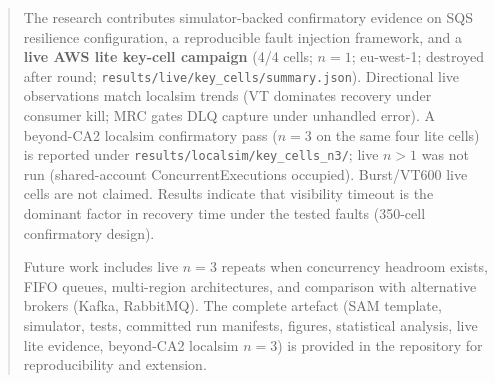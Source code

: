 \begin{abstract}
The research contributes simulator-backed confirmatory evidence on SQS resilience configuration, a reproducible fault injection framework, and a \textbf{live AWS lite key-cell campaign} (4/4 cells; $n{=}1$; eu-west-1; destroyed after round; \texttt{results/live/key\_cells/summary.json}). Directional live observations match localsim trends (VT dominates recovery under consumer kill; MRC gates DLQ capture under unhandled error). A beyond-CA2 localsim confirmatory pass ($n{=}3$ on the same four lite cells) is reported under \texttt{results/localsim/key\_cells\_n3/}; live $n{>}1$ was not run (shared-account ConcurrentExecutions occupied). Burst/VT600 live cells are not claimed. Results indicate that visibility timeout is the dominant factor in recovery time under the tested faults (350-cell confirmatory design).

Future work includes live $n{=}3$ repeats when concurrency headroom exists, FIFO queues, multi-region architectures, and comparison with alternative brokers (Kafka, RabbitMQ). The complete artefact (SAM template, simulator, tests, committed run manifests, figures, statistical analysis, live lite evidence, beyond-CA2 localsim $n{=}3$) is provided in the repository for reproducibility and extension.

\end{abstract}
